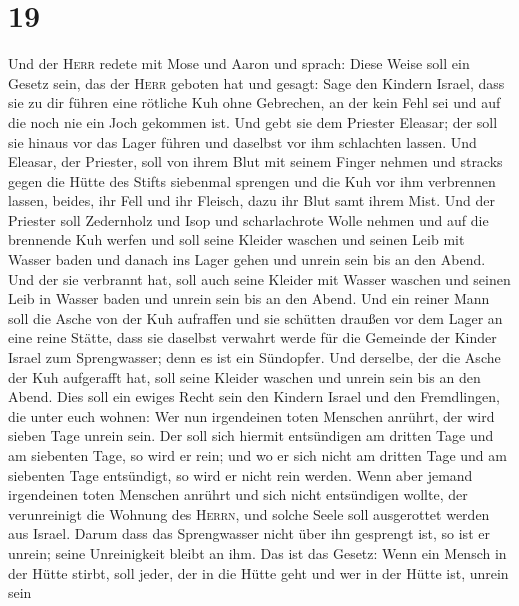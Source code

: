 \hypertarget{section-18}{%
\section{19}\label{section-18}}

 Und der \textsc{Herr} redete mit Mose und Aaron und
sprach:  Diese Weise soll ein Gesetz sein, das der
\textsc{Herr} geboten hat und gesagt: Sage den Kindern Israel, dass sie
zu dir führen eine rötliche Kuh ohne Gebrechen, an der kein Fehl sei und
auf die noch nie ein Joch gekommen ist.  Und gebt sie dem
Priester Eleasar; der soll sie hinaus vor das Lager führen und daselbst
vor ihm schlachten lassen.  Und Eleasar, der Priester,
soll von ihrem Blut mit seinem Finger nehmen und stracks gegen die Hütte
des Stifts siebenmal sprengen  und die Kuh vor ihm
verbrennen lassen, beides, ihr Fell und ihr Fleisch, dazu ihr Blut samt
ihrem Mist.  Und der Priester soll Zedernholz und Isop und
scharlachrote Wolle nehmen und auf die brennende Kuh werfen
 und soll seine Kleider waschen und seinen Leib mit Wasser
baden und danach ins Lager gehen und unrein sein bis an den Abend.
 Und der sie verbrannt hat, soll auch seine Kleider mit
Wasser waschen und seinen Leib in Wasser baden und unrein sein bis an
den Abend.  Und ein reiner Mann soll die Asche von der Kuh
aufraffen und sie schütten draußen vor dem Lager an eine reine Stätte,
dass sie daselbst verwahrt werde für die Gemeinde der Kinder Israel zum
Sprengwasser; denn es ist ein Sündopfer.  Und derselbe,
der die Asche der Kuh aufgerafft hat, soll seine Kleider waschen und
unrein sein bis an den Abend. Dies soll ein ewiges Recht sein den
Kindern Israel und den Fremdlingen, die unter euch wohnen:
 Wer nun irgendeinen toten Menschen anrührt, der wird
sieben Tage unrein sein.  Der soll sich hiermit
entsündigen am dritten Tage und am siebenten Tage, so wird er rein; und
wo er sich nicht am dritten Tage und am siebenten Tage entsündigt, so
wird er nicht rein werden.  Wenn aber jemand irgendeinen
toten Menschen anrührt und sich nicht entsündigen wollte, der
verunreinigt die Wohnung des \textsc{Herrn}, und solche Seele soll
ausgerottet werden aus Israel. Darum dass das Sprengwasser nicht über
ihn gesprengt ist, so ist er unrein; seine Unreinigkeit bleibt an ihm.
 Das ist das Gesetz: Wenn ein Mensch in der Hütte stirbt,
soll jeder, der in die Hütte geht und wer in der Hütte ist, unrein sein
